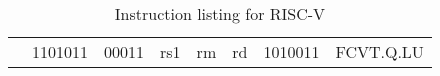 \begin{table}[p]
\begin{small}
\begin{center}
\begin{tabular}{p{0in}p{0.4in}p{0.05in}p{0.05in}p{0.05in}p{0.05in}p{0.4in}p{0.6in}p{0.4in}p{0.6in}p{0.7in}l}
&
\multicolumn{4}{|c|}{1101011} &
\multicolumn{2}{c|}{00011} &
\multicolumn{1}{c|}{rs1} &
\multicolumn{1}{c|}{rm} &
\multicolumn{1}{c|}{rd} &
\multicolumn{1}{c|}{1010011} & FCVT.Q.LU \\
\cline{2-11}
  

\end{tabular}
\end{center}
\end{small}
\caption{Instruction listing for RISC-V}
\end{table}
  
